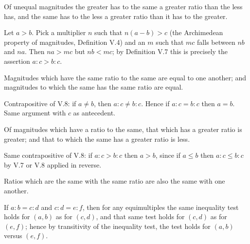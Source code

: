 \begin{claim}
\label{prop:V.8}
Of unequal magnitudes the greater has to the same a greater ratio
than the less has, and the same has to the less a greater ratio than
it has to the greater.
\end{claim}
\begin{evidence}[Proof of V.8]
\label{ev:V.8}
Let $a > b$.  Pick a multiplier $n$ such that $n(a-b) > c$ (the
Archimedean property of magnitudes, Definition V.4) and an $m$ such
that $mc$ falls between $nb$ and $na$.  Then $na > mc$ but $nb < mc$;
by Definition V.7 this is precisely the assertion $a:c > b:c$.
\end{evidence}

\begin{claim}
\label{prop:V.9}
Magnitudes which have the same ratio to the same are equal to one
another; and magnitudes to which the same has the same ratio are
equal.
\end{claim}
\begin{evidence}[Proof of V.9]
\label{ev:V.9}
Contrapositive of V.8: if $a \neq b$, then $a:c \neq b:c$.  Hence if
$a:c = b:c$ then $a = b$.  Same argument with $c$ as antecedent.
\end{evidence}

\begin{claim}
\label{prop:V.10}
Of magnitudes which have a ratio to the same, that which has a greater
ratio is greater; and that to which the same has a greater ratio is
less.
\end{claim}
\begin{evidence}[Proof of V.10]
\label{ev:V.10}
Same contrapositive of V.8: if $a:c > b:c$ then $a > b$, since if
$a \le b$ then $a:c \le b:c$ by V.7 or V.8 applied in reverse.
\end{evidence}

\begin{claim}
\label{prop:V.11}
Ratios which are the same with the same ratio are also the same with
one another.
\end{claim}
\begin{evidence}[Proof of V.11]
\label{ev:V.11}
If $a:b = c:d$ and $c:d = e:f$, then for any equimultiples the same
inequality test holds for $(a,b)$ as for $(c,d)$, and that same test
holds for $(c,d)$ as for $(e,f)$; hence by transitivity of the
inequality test, the test holds for $(a,b)$ versus $(e,f)$.
\end{evidence}

